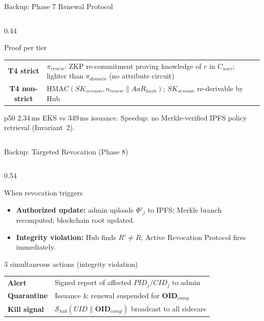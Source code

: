 \documentclass[aspectratio=169,11pt]{beamer}
\newcommand{\tightitems}{%
  \setlength{\topsep}{2pt}%
  \setlength{\itemsep}{4pt}%
  \setlength{\parsep}{0pt}%
}
\newcommand{\pinkbanner}[1]{%
  \begin{center}
  \begin{tcolorbox}[colback=fedacGray,colframe=fedacGray,
                    boxrule=0pt,arc=1mm,left=10pt,right=10pt,top=3pt,bottom=3pt,
                    width=0.96\linewidth,
                    borderline west={2pt}{0pt}{fedacTeal}]
  \footnotesize\color{fedacNavyD}#1
  \end{tcolorbox}
  \end{center}}
\begin{document}
{\begin{frame}[noframenumbering]{Backup: Phase 7 Renewal Protocol}
\begin{columns}[T,onlytextwidth]
\begin{column}{0.44\textwidth}
\begin{callout}{Proof per tier}
\begin{tabular}{>{\bfseries}c p{3.5cm}}
T4 strict & $\pi_{renew}$: ZKP re-commitment proving knowledge of $r$ in $C_{user}$; lighter than $\pi_{domain}$ (no attribute circuit) \\[2pt]
T4 non-strict & $\mathrm{HMAC}(SK_{session}, n_{renew} \| AaR_{hash})$; $SK_{session}$ re-derivable by Hub \\
\end{tabular}
\end{callout}
\vspace{2pt}
\pinkbanner{p50 2.34\,ms EKS vs 349\,ms issuance. Speedup: no Merkle-verified IPFS policy retrieval (Invariant~2).}
\end{column}
\end{columns}
\end{frame}

\begin{frame}[noframenumbering]{Backup: Targeted Revocation (Phase 8)}
\vspace{-0.6cm}
\begin{columns}[T,onlytextwidth]
\begin{column}{0.54\textwidth}
\begin{callout}{When revocation triggers}
\tiny
\begin{itemize}\tightitems
\item \textbf{Authorized update:} admin uploads $\Phi'_j$ to IPFS; Merkle branch recomputed; blockchain root updated.
\item \textbf{Integrity violation:} Hub finds $R' \neq R$; Active Revocation Protocol fires immediately.
\end{itemize}
\end{callout}
\begin{callout}{3 simultaneous actions (integrity violation)}
\tiny
\setlength{\tabcolsep}{2pt}
\renewcommand{\arraystretch}{1.05}
\begin{tabular}{>{\bfseries}l p{4.5cm}}
Alert     & Signed report of affected $PID_j/CID_j$ to admin \\
Quarantine & Issuance \& renewal suspended for $\mathbf{OID}_{comp}$ \\
Kill signal & $\mathcal{S}_{hub}(UID \| \mathbf{OID}_{comp})$ broadcast to all sidecars \\
\end{tabular}
\end{callout}
\end{column}

\end{columns}
\end{frame}}
\end{document}
